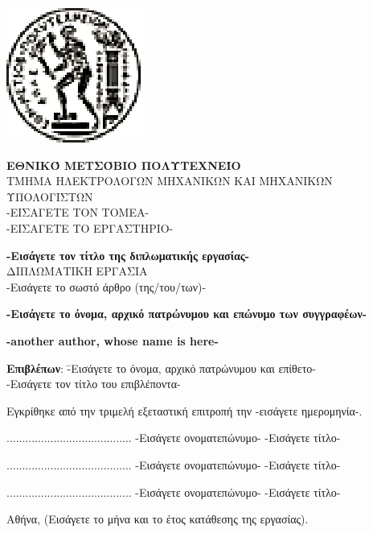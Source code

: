 \documentclass[12pt, twoside, a4paper]{report}
\begin{document}
\maketitle
\newpage
\hspace{10pt}
\newpage
\includegraphics{pyrforos.eps}
\noindent
\parbox[b]{0.6\textwidth} {\textbf{
\noindent
\normalsize{Ε}\small{ΘΝΙΚΌ}
\normalsize{Μ}\small{ΕΤΣΌΒΙΟ}
\normalsize{Π}\small{ΟΛΥΤΕΧΝΕΊΟ}} \\
\small
TMHMA
ΗΛΕΚΤΡΟΛΟΓΩΝ
ΜΗΧΑΝΙΚΩΝ
ΚΑΙ
ΜΗΧΑΝΙΚΩΝ
ΥΠΟΛΟΓΙΣΤΩΝ \\
-ΕΙΣΑΓΕΤΕ ΤΟΝ ΤΟΜΕΑ- \\
-ΕΙΣΑΓΕΤΕ ΤΟ ΕΡΓΑΣΤΗΡΙΟ- \\
}

\begin{center}
\vspace{8ex}
\large \textbf{-Εισάγετε τον τίτλο της διπλωματικής εργασίας-} \\
\vspace{10ex}
\large
ΔΙΠΛΩΜΑΤΙΚΗ ΕΡΓΑΣΙΑ\\
\vspace{2ex}
\normalsize
-Εισάγετε το σωστό άρθρο (της/του/των)- \\
\vspace{2ex}
\parbox[c]{0.4\textwidth} { \center\textbf{
-Εισάγετε το όνομα, αρχικό πατρώνυμου και επώνυμο των συγγραφέων- }}
\parbox[c]{0.4\textwidth} { \center\textbf{
	-another author, whose name is here- }}
\vspace{10ex}
\flushleft
\begin{tabbing}
	\textbf{Επιβλέπων}: \= -Εισάγετε το όνομα, αρχικό πατρώνυμου
				και επίθετο- \\
			    \> -Εισάγετε τον τίτλο του επιβλέποντα-
\end{tabbing}
\end{center}

\noindent
Εγκρίθηκε από την τριμελή εξεταστική επιτροπή την -εισάγετε ημερομηνία-.

\begin{center}
\scriptsize
\parbox[b]{0.3\textwidth} {\center
	........................................
	-Εισάγετε ονοματεπώνυμο-
	-Εισάγετε τίτλο-
}
\parbox[b]{0.3\textwidth} {\center
	........................................
	-Εισάγετε ονοματεπώνυμο-
	-Εισάγετε τίτλο-
}
\parbox[b]{0.3\textwidth} {\center
	........................................
	-Εισάγετε ονοματεπώνυμο-
	-Εισάγετε τίτλο-
}
\end{center}
\vspace{10ex}
\normalsize
\noindent
Αθήνα, (Εισάγετε το μήνα και το έτος κατάθεσης της εργασίας).
\newpage
\hspace{10pt}
\end{document}
